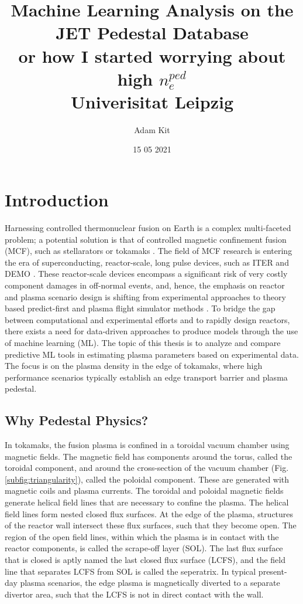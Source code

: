 \documentclass[a4paper, twoside, final, 12pt]{article}
\title{
	{Machine Learning Analysis on the JET Pedestal Database } \\ 
	{\large or how I started worrying about high $n_e^{ped}$}\\
	{\large Univerisitat Leipzig} \\ 
	}
\author{Adam Kit}
\date{15 05 2021}
\begin{document}
    \maketitle
    \newpage
    \tableofcontents
    \newpage
\section{Introduction}\label{sec:introduction}
Harnessing controlled thermonuclear fusion on Earth is a complex multi-faceted problem; a potential solution is that of controlled magnetic confinement fusion (MCF), such as stellarators or tokamaks \cite{EUROfusionroadmap}. 
The field of MCF research is entering the era of superconducting, reactor-scale, long pulse devices, such as ITER and DEMO \cite{Ikeda_2007, stepladder}.
These reactor-scale devices encompass a significant risk of very costly component damages in off-normal events, and, hence, the emphasis on reactor and plasma scenario design is shifting from experimental approaches to theory based predict-first and plasma flight simulator methods \cite{Meneghini_2017, MOREAU2011535}.
To bridge the gap between computational and experimental efforts and to rapidly design reactors, there exists a need for data-driven approaches to produce models through the use of machine learning (ML).
The topic of this thesis is to analyze and compare predictive ML tools in estimating plasma parameters based on experimental data. The focus is on the plasma density in the edge of tokamaks, where high performance scenarios typically establish an edge transport barrier and plasma pedestal. 

\subsection{Why Pedestal Physics?}\label{subsec:purpose}
In tokamaks, the fusion plasma is confined in a toroidal vacuum chamber using magnetic fields.
The magnetic field has components around the torus, called the toroidal component, and around the cross-section of the vacuum chamber (Fig. \ref{subfig:triangularity}), called the poloidal component.
These are generated with magnetic coils and plasma currents.
The toroidal and poloidal magnetic fields generate helical field lines that are necessary to confine the plasma.
The helical field lines form nested closed flux surfaces.
At the edge of the plasma, structures of the reactor wall intersect these flux surfaces, such that they become open.
The region of the open field lines, within which the plasma is in contact with the reactor components, is called the scrape-off layer (SOL).
The last flux surface that is closed is aptly named the last closed flux surface (LCFS), and the field line that separates LCFS from SOL is called the seperatrix.
In typical present-day plasma scenarios, the edge plasma is magnetically diverted to a separate divertor area, such that the LCFS is not in direct contact with the wall.
\end{document}
